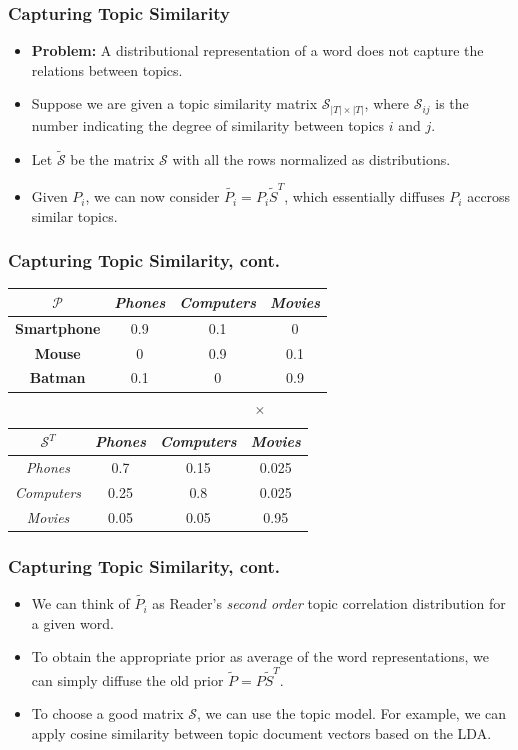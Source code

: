 \documentclass{beamer}
\newcommand\cP{{\mathcal P}}
\newcommand\cS{{\mathcal S}}
\begin{document}
\begin{frame}
\frametitle{Capturing Topic Similarity}
\begin{itemize}
\item {\bf Problem:} A distributional representation of a word does
  not capture the relations between topics.
\item Suppose we are given a topic similarity matrix
  $\cS_{|T|\times|T|}$, where $\cS_{ij}$ is the number indicating
  the degree of similarity between topics $i$ and $j$. 
\item Let $\tilde{\cS}$ be the matrix $\cS$ with all the rows normalized as
  distributions. 
\item Given $P_i$, we can now consider $\tilde{P_i}=P_i\tilde{S}^T$, which
  essentially diffuses $P_i$ accross similar topics.
\end{itemize}
\end{frame}

\begin{frame}
\frametitle{Capturing Topic Similarity, cont.}
\begin{center}
\begin{tabular}{c|ccc}
$\cP$& {\it Phones} & {\it Computers} & {\it Movies}\\
\hline
{\bf Smartphone} & 0.9 & 0.1 & 0\\
 {\bf Mouse} & 0 & 0.9 & 0.1\\
 {\bf Batman} & 0.1 & 0 & 0.9
\end{tabular}
$$\times$$
\begin{tabular}{c|ccc}
$\cS^T$& {\it Phones} & {\it Computers} & {\it Movies}\\
\hline
{\it Phones} & 0.7 & 0.15 & 0.025\\
\hline
{\it Computers} & 0.25 & 0.8 & 0.025\\
\hline
{\it Movies} & 0.05 & 0.05 &  0.95 
\end{tabular}
\end{center}

\end{frame}

\begin{frame}
\frametitle{Capturing Topic Similarity, cont.}
\begin{itemize}
\item We can think of $\tilde{P_i}$ as Reader's {\em second order}
  topic correlation distribution for a given word.
\item To obtain the appropriate prior as average of the word
  representations, we can simply diffuse the old prior
  $\tilde{P}=P\tilde{S}^T$. 
\item To choose a good matrix $\cS$, we can use the topic model. For
  example, we can apply cosine similarity between topic document
  vectors based on the LDA. 
\end{itemize}
\end{frame}
\end{document}
